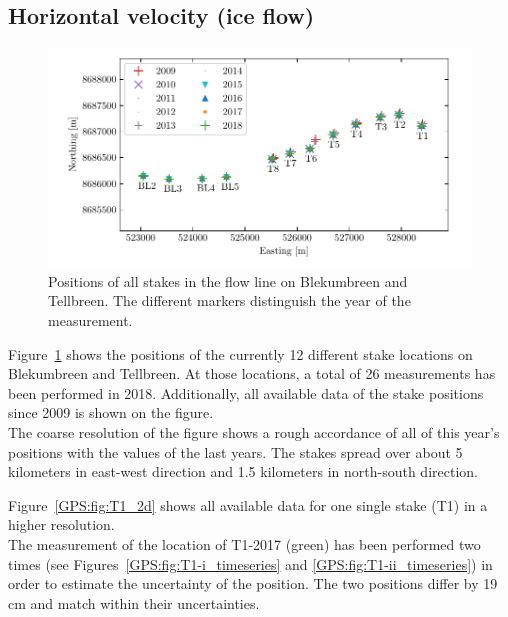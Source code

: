 \subsection{Horizontal velocity (ice flow)}

\begin{figure}[H]
    \centering
    \includegraphics[width=\textwidth]{./figs/stakePositions.pdf}
    \caption{Positions of all stakes in the flow line on Blekumbreen and Tellbreen.
    The different markers distinguish the year of the measurement.}
    \label{GPS:fig:stakepos}
\end{figure}

Figure~\ref{GPS:fig:stakepos} shows the positions of the currently 12 different stake locations
on Blekumbreen and Tellbreen.
At those locations, a total of 26 measurements has been performed in 2018.
Additionally, all available data of the stake positions since 2009 is shown on the figure.\\
The coarse resolution of the figure shows a rough accordance of all of this year's positions with the values 
of the last years.
The stakes spread over about 5 kilometers in east-west direction and 1.5 kilometers in north-south direction.

Figure~\ref{GPS:fig:T1_2d} shows all available data for one single stake (T1) in a higher resolution.\\
The measurement of the location of T1-2017 (green) has been performed two times
(see Figures~\ref{GPS:fig:T1-i_timeseries} and \ref{GPS:fig:T1-ii_timeseries})
in order to estimate the uncertainty
of the position.
The two positions differ by 19\,cm and match within their uncertainties.

